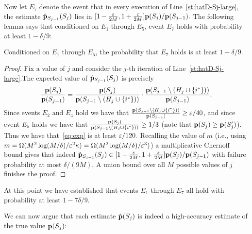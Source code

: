 Now let $E_7$ denote the event that
in every execution of Line~\ref{st:hatD-Sj-large}, the estimate
$\hat{\mathbf{p}}_{S_{j-1}}(S_j)$ lies in
$[ 1 - {\frac{\varepsilon}{2M}}, 1 + {\frac{\varepsilon}{2M}}] \mathbf{p}(S_j)/\mathbf{p}(S_{j-1}).$
The following lemma says that conditioned on $E_1$ through $E_5$,
event $E_7$ holds with probability at least $1-\delta/9$:

\begin{lemma} \label{lem:Sj-accurate}
Conditioned on $E_1$ through $E_5$, the probability that
$E_7$ holds is at least $1 - \delta/9$.
\end{lemma}

\begin{proof}
Fix a value of $j$ and consider the $j$-th iteration of
Line~\ref{st:hatD-Sj-large}.The expected value of $\hat{\mathbf{p}}_{S_{j-1}}(S_j)$ is precisely
\begin{equation} \label{eq:exp}
{\frac {\ensuremath{\mathbf{p}}(S_{j})} {\ensuremath{\mathbf{p}}(S_{j-1})}} =
{\frac {\mathbf{p}(S_{j})} {\mathbf{p}(S_{j-1} \setminus (H_{j} \cup \{i^\ast\}))}} \cdot
{\frac {\ensuremath{\mathbf{p}}(S_{j-1} \setminus (H_{j} \cup \{i^\ast\}))}{\ensuremath{\mathbf{p}}(S_{j-1})}}.
\end{equation}
Since events $E_2$ and $E_4$ hold we have that
${\frac {\mathbf{p}(S_{j-1} \setminus (H_{j} \cup \{i^\ast\}))}{\mathbf{p}(S_{j-1})}} \geq
\varepsilon/40$, and
since event $E_5$ holds we have that
${\frac {\mathbf{p}(S_{j})} {\mathbf{p}(S_{j-1} \setminus (H_{j} \cup \{i^\ast\}))}} \geq 1/3$
(note that $\mathbf{p}(S_j) \geq \mathbf{p}(S'_j)$).
Thus we have that~\eqref{eq:exp} is at least $\varepsilon/120.$
Recalling the value of $m$ (i.e., using $m=\Omega(M^2\log(M/\delta)/\varepsilon^2\kappa) = \Omega(M^2\log(M/\delta)/\varepsilon^3)$)
a multiplicative Chernoff bound gives that indeed
$\hat{\mathbf{p}}_{S_{j-1}}(S_j) \in [1 - {\frac{\varepsilon}{2M}},
1 + {\frac{\varepsilon}{2M}}] \mathbf{p}(S_j)/\mathbf{p}(S_{j-1})$
with failure probability at most $\delta/(9M).$  A
union bound over all $M$ possible values
of $j$ finishes the proof.
\end{proof}

At this point we have established that events $E_1$ through $E_7$
all hold with probability at least $1-7\delta/9$.

We can now argue that each estimate $\hat{\mathbf{p}}(S_j)$ is indeed a high-accuracy
estimate of the true value $\mathbf{p}(S_j)$:

